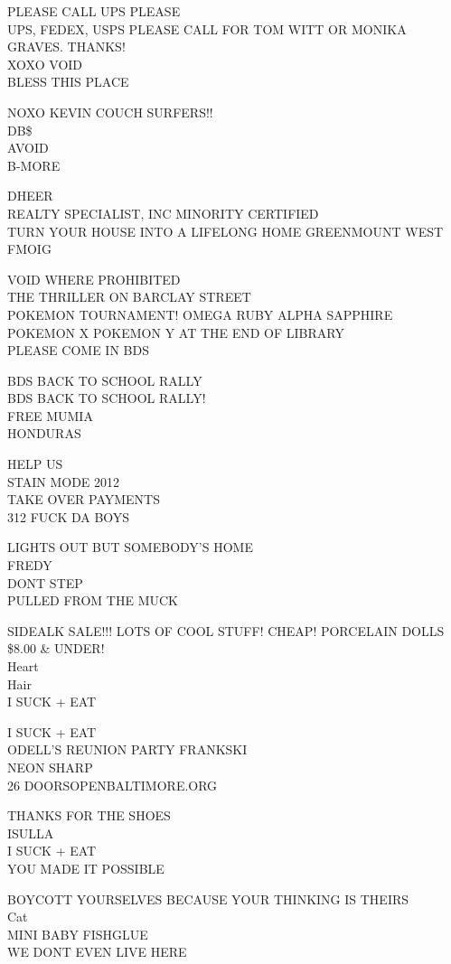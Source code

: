 \documentclass[10pt,letterpaper]{article}
\begin{document}
PLEASE CALL UPS PLEASE\\
UPS, FEDEX, USPS PLEASE CALL FOR TOM WITT OR MONIKA GRAVES.  THANKS!\\
XOXO VOID\\
BLESS THIS PLACE

NOXO KEVIN COUCH SURFERS!!\\
DB\$\\
AVOID\\
B{-}MORE

DHEER\\
REALTY SPECIALIST, INC MINORITY CERTIFIED\\
TURN YOUR HOUSE INTO A LIFELONG HOME GREENMOUNT WEST\\
FMOIG

VOID WHERE PROHIBITED\\
THE THRILLER ON BARCLAY STREET\\
POKEMON TOURNAMENT!  OMEGA RUBY ALPHA SAPPHIRE POKEMON X POKEMON Y AT THE END OF LIBRARY\\
PLEASE COME IN BDS

BDS BACK TO SCHOOL RALLY\\
BDS BACK TO SCHOOL RALLY!\\
FREE MUMIA\\
HONDURAS

HELP US\\
STAIN MODE 2012\\
TAKE OVER PAYMENTS\\
312 FUCK DA BOYS

LIGHTS OUT BUT SOMEBODY'S HOME\\
FREDY\\
DONT STEP\\
PULLED FROM THE MUCK

SIDEALK SALE!!!  LOTS OF COOL STUFF!  CHEAP!  PORCELAIN DOLLS \$8.00 \& UNDER!\\
Heart\\
Hair\\
I SUCK + EAT

I SUCK + EAT\\
ODELL'S REUNION PARTY FRANKSKI\\
NEON SHARP\\
26 DOORSOPENBALTIMORE.ORG

THANKS FOR THE SHOES\\
ISULLA\\
I SUCK + EAT\\
YOU MADE IT POSSIBLE

BOYCOTT YOURSELVES BECAUSE YOUR THINKING IS THEIRS\\
Cat\\
MINI BABY FISHGLUE\\
WE DONT EVEN LIVE HERE
\end{document}
